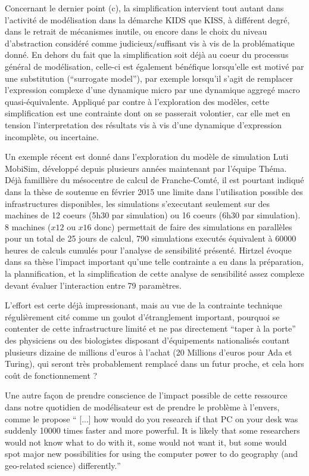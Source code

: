 Concernant le dernier point (c), la simplification intervient tout autant dans l'activité de modélisation dans la démarche KIDS que KISS, à différent degré, dans le retrait de mécanismes inutile, ou encore dans le choix du niveau d'abstraction considéré comme judicieux/suffisant vis à vis de la problématique donné. En dehors du fait que la simplification soit déjà au coeur du processus général de modélisation, celle-ci est également bénéfique lorsqu'elle est motivé par une substitution (\enquote{surrogate model}), par exemple lorsqu'il s'agit de remplacer l'expression complexe d'une dynamique micro par une dynamique aggregé macro quasi-équivalente. Appliqué par contre à l'exploration des modèles, cette simplification est une contrainte dont on se passerait volontier, car elle met en tension l'interpretation des résultats vis à vis d'une dynamique d'expression incomplète, ou incertaine.

Un exemple récent est donné dans l'exploration du modèle de simulation Luti MobiSim, développé depuis plusieurs années maintenant par l'équipe Théma. Déjà famillière du mésocentre de calcul de Franche-Comté, il est pourtant indiqué dans la thèse de \textcite{Hirtzel2015} soutenue en février 2015 une limite dans l'utilisation possible des infrastructures disponibles, les simulations s'executant seulement sur des machines de 12 coeurs (5h30 par simulation) ou 16 coeurs (6h30 par simulation). 8 machines ($ x 12$ ou $ x 16$ donc) permettait de faire des simulations en parallèles pour un total de 25 jours de calcul, 790 simulations executés équivalent à 60000 heures de calculs cumulés pour l'analyse de sensibilité présenté. Hirtzel évoque dans sa thèse l'impact important qu'une telle contrainte a eu dans la préparation, la plannification, et la simplification de cette analyse de sensibilité assez complexe devant évaluer l'interaction entre 79 paramètres. 

L'effort est certe déjà impressionant, mais au vue de la contrainte technique régulièrement cité comme un goulot d'étranglement important, pourquoi se contenter de cette infrastructure limité et ne pas directement \enquote{taper à la porte} des physiciens ou des biologistes disposant d'équipements nationalisés coutant plusieurs dizaine de millions d'euros à l'achat (20 Millions d'euros pour Ada et Turing), qui seront très probablement remplacé dans un futur proche, et cela hors coût de fonctionnement ? 

Une autre façon de prendre conscience de l'impact possible de cette ressource dans notre quotidien de modélisateur est de prendre le problème à l'envers, comme le propose \textcite{Openshaw2000}  \foreignquote{english}{ [...] how would do you research if that PC on your desk was suddenly 10000 times faster and more powerful. It is likely that some researchers would not know what to do with it, some would not want it, but some would spot major new possibilities for using the computer power to do geography (and geo-related science) differently.}

